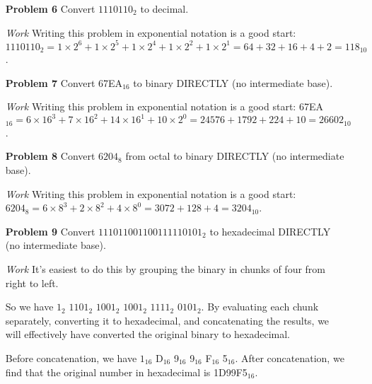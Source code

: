 \documentclass[12pt]{article}
\begin{document}
\begin{enumerate}
  \item[\textbf{Problem 6}] Convert $1110110_2$ to decimal.
\end{enumerate}

\begin{enumerate}
  \item[\textit{Work}] Writing this problem in exponential notation is a good start: $1110110_2 = 1\times2^6+1\times2^5+1\times2^4+1\times2^2+1\times2^1 = 64+32+16+4+2=118_{10}$.
\end{enumerate}


\begin{enumerate}
  \item[\textbf{Problem 7}] Convert 67EA$_{16}$ to binary DIRECTLY (no intermediate base).
\end{enumerate}

\begin{enumerate}
  \item[\textit{Work}] Writing this problem in exponential notation is a good start: 67EA$_{16} = 6\times16^3+7\times16^2+14\times16^1+10\times2^0 = 24576+1792+224+10=26602_{10}$.
\end{enumerate}


\begin{enumerate}
  \item[\textbf{Problem 8}] Convert $6204_8$ from octal to binary DIRECTLY (no intermediate base).
\end{enumerate}

\begin{enumerate}
  \item[\textit{Work}] Writing this problem in exponential notation is a good start: $6204_8 = 6\times8^3+2\times8^2+4\times8^0 = 3072+128+4=3204_{10}$.
\end{enumerate}


\begin{enumerate}
  \item[\textbf{Problem 9}] Convert $111011001100111110101_2$ to hexadecimal DIRECTLY (no intermediate base).
\end{enumerate}

\begin{enumerate}
  \item[\textit{Work}] It's easiest to do this by grouping the binary in chunks of four from right to left.
  \item[] So we have $1_2$ $1101_2$ $1001_2$ $1001_2$ $1111_2$ $0101_2$. By evaluating each chunk separately, converting it to hexadecimal, and concatenating the results, we will effectively have converted the original binary to hexadecimal.
  \item[] Before concatenation, we have $1_{16}$ D$_{16}$ 9$_{16}$ 9$_{16}$ F$_{16}$ 5$_{16}$. After concatenation, we find that the original number in hexadecimal is 1D99F5$_{16}$.
\end{enumerate}
\end{document}
